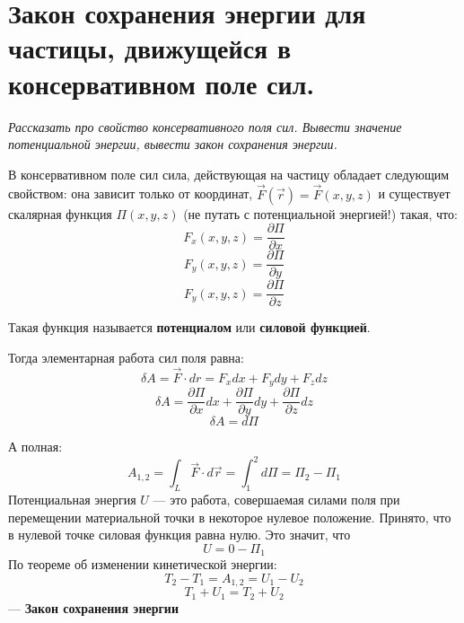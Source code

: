 \documentclass{article}
\begin{document}
   \section{Закон сохранения энергии для частицы, движущейся в консервативном поле сил.}
    \par
      \textit{Рассказать про свойство консервативного поля сил. Вывести значение потенциальной энергии, вывести закон сохранения энергии.}\\
    \par
      В консервативном поле сил сила, действующая на частицу обладает следующим свойством: она зависит только от координат, $\vec F(\vec r)=\vec F(x,y,z)$ и существует скалярная функция $\Pi(x,y,z)$ (не путать с потенциальной энергией!) такая, что:
      \begin{equation}
	F_x(x,y,z)=\frac{\partial\Pi}{\partial x}
      \end{equation}
      \begin{equation}
	F_y(x,y,z)=\frac{\partial\Pi}{\partial y}
      \end{equation}
      \begin{equation}
	F_y(x,y,z)=\frac{\partial\Pi}{\partial z}
      \end{equation}
    \par
      Такая функция называется \textbf{потенциалом} или \textbf{силовой функцией}.
    \par
      Тогда элементарная работа сил поля равна:
      \begin{equation}
	\delta A = \vec F\cdot dr = F_xdx+F_ydy+F_zdz
      \end{equation}
      \begin{equation}
	\delta A = \frac{\partial\Pi}{\partial x}dx + \frac{\partial\Pi}{\partial y}dy + \frac{\partial\Pi}{\partial z}dz
      \end{equation}    
      \begin{equation}
	\delta A=d\Pi
      \end{equation} 
    \par
      А полная:
      \begin{equation}
	A_{1,2}=\int_L\vec F\cdot d\vec r=\int_1^2d\Pi=\Pi_2-\Pi_1
      \end{equation}
      Потенциальная энергия $U$ --- это работа, совершаемая силами поля при перемещении материальной точки в некоторое нулевое положение. Принято, что в нулевой точке силовая функция равна нулю. Это значит, что
      \begin{equation}
	U=0-\Pi_1
      \end{equation}
      По теореме об изменении кинетической энергии:
      \begin{equation}
	T_2-T_1=A_{1,2}=U_1-U_2
      \end{equation}
      \begin{equation}
	T_1+U_1=T_2+U_2
      \end{equation}
      --- \textbf{Закон сохранения энергии}
  \clearpage
  
\end{document}
